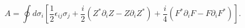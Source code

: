 \begin{equation}
\label{totalarea}
A=\oint d\sigma_i[\frac{1}{2}\epsilon_{ij}\sigma_j+\frac{i}{2}(Z^*\partial_iZ-Z\partial_iZ^*)+\frac{i}{4}(F^*\partial_iF-F\partial_iF^*)].
\end{equation}

